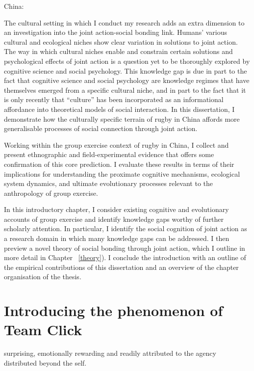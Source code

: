 \begin{CJK}{UTF8}{gbsn}
    China:

    The cultural setting in which I conduct my research adds an extra dimension to an investigation into the joint action-social bonding link. Humans' various cultural and ecological niches show clear variation in solutions to joint action.  The way in which cultural niches enable and constrain certain solutions and psychological effects of joint action is a question yet to be thoroughly explored by cognitive science and social psychology.  This knowledge gap is due in part to the fact that cognitive science and social psychology are knowledge regimes that have themselves emerged from a specific cultural niche, and in part to the fact that it is only recently that ``culture'' has been incorporated as an informational affordance into theoretical models of social interaction. In this dissertation, I demonstrate how the culturally specific terrain of rugby in China affords more generalisable processes of social connection through joint action.


  Working within the group exercise context of rugby in China, I collect and present ethnographic and field-experimental evidence that offers some confirmation of this core prediction.  I evaluate these results in terms of their implications for understanding the proximate cognitive mechanisms, ecological system dynamics, and ultimate evolutionary processes relevant to the anthropology of group exercise.

In this introductory chapter, I consider existing cognitive and evolutionary accounts of group exercise and identify knowledge gaps worthy of further scholarly attention.  In particular, I identify the  social cognition of joint action as a research domain in which many knowledge gaps can be addressed.  I then preview a novel theory of social bonding through joint action, which I outline in more detail in Chapter ~\ref{theory}).  I conclude the introduction with an outline of the empirical contributions of this dissertation and an overview of the chapter organisation of the thesis.










\section{Introducing the phenomenon of Team Click}


surprising, emotionally rewarding and readily attributed to the agency distributed beyond the self.


\end{CJK}
